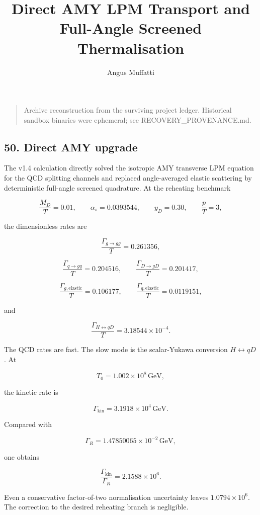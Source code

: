 \documentclass[
]{article}
\title{Direct AMY LPM Transport and Full-Angle Screened Thermalisation}
\author{Angus Muffatti}
\date{}
\begin{document}
\maketitle

\begin{quote}
Archive reconstruction from the surviving project ledger. Historical
sandbox binaries were ephemeral; see RECOVERY\_PROVENANCE.md.
\end{quote}

\hypertarget{direct-amy-upgrade}{%
\subsection{50. Direct AMY upgrade}\label{direct-amy-upgrade}}

The v1.4 calculation directly solved the isotropic AMY transverse LPM
equation for the QCD splitting channels and replaced angle-averaged
elastic scattering by deterministic full-angle screened quadrature. At
the reheating benchmark

\[
\frac{M_D}{T}=0.01,
\qquad
\alpha_s=0.0393544,
\qquad
y_D=0.30,
\qquad
\frac pT=3,
\]

the dimensionless rates are

\[
\frac{\Gamma_{g\to gg}}T=0.261356,
\]

\[
\frac{\Gamma_{q\to gq}}T=0.204516,
\qquad
\frac{\Gamma_{D\to gD}}T=0.201417,
\]

\[
\frac{\Gamma_{g,\mathrm{elastic}}}T=0.106177,
\qquad
\frac{\Gamma_{q,\mathrm{elastic}}}T=0.0119151,
\]

and

\[
\boxed{
\frac{\Gamma_{H\leftrightarrow qD}}T
=3.18544\times10^{-4}.
}
\]

The QCD rates are fast. The slow mode is the scalar-Yukawa conversion
\(H\leftrightarrow qD\). At

\[
T_0=1.002\times10^8\,\mathrm{GeV},
\]

the kinetic rate is

\[
\Gamma_{\mathrm{kin}}=3.1918\times10^4\,\mathrm{GeV}.
\]

Compared with

\[
\Gamma_R=1.47850065\times10^{-2}\,\mathrm{GeV},
\]

one obtains

\[
\boxed{
\frac{\Gamma_{\mathrm{kin}}}{\Gamma_R}
=2.1588\times10^6.
}
\]

Even a conservative factor-of-two normalisation uncertainty leaves
\(1.0794\times10^6\). The correction to the desired reheating branch is
negligible.
\end{document}
